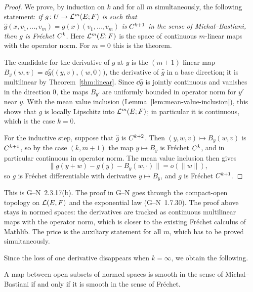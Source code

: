 \begin{proof}
  \leanok
  We prove, by induction on $k$ and for all $m$ simultaneously, the following statement:
  \emph{if $g \colon U \to \mathcal{L}^m(E; F)$ is such that
  $\hat g(x, v_1, \dots, v_m) = g(x)(v_1, \dots, v_m)$ is $C^{k+1}$ in the sense of
  Michal--Bastiani, then $g$ is Fréchet $C^{k}$}. Here $\mathcal{L}^m(E; F)$ is the space of continuous
  $m$-linear maps with the operator norm. For $m = 0$ this is the theorem.

  The candidate for the derivative of $g$ at $y$ is the $(m+1)$-linear map
  $B_y(w, v) = \dd \hat g\bigl((y, v), (w, 0)\bigr)$, the derivative of $\hat g$ in a base
  direction; it is multilinear by Theorem~\ref{thm:linear}. Since $\dd \hat g$ is jointly
  continuous and vanishes in the direction $0$, the maps $B_{y'}$ are uniformly bounded in
  operator norm for $y'$ near $y$. With the mean value inclusion
  (Lemma~\ref{lem:mean-value-inclusion}), this shows that $g$ is locally Lipschitz into
  $\mathcal{L}^m(E; F)$; in particular it is continuous, which is the case $k = 0$.

  For the inductive step, suppose that $\hat g$ is $C^{k+2}$. Then
  $(y, w, v) \mapsto B_y(w, v)$ is $C^{k+1}$, so by the case $(k, m + 1)$ the
  map $y \mapsto B_y$ is Fréchet $C^{k}$, and in particular continuous in operator norm. The mean
  value inclusion then gives
  \[
    \|g(y + w) - g(y) - B_y(w, \cdot)\| = o(\|w\|),
  \]
  so $g$ is Fréchet differentiable with derivative $y \mapsto B_y$, and $g$ is Fréchet
  $C^{k+1}$.
\end{proof}

\begin{remark}
  This is G--N~2.3.17(b). The proof in G--N goes through the compact-open topology on
  $\mathcal{L}(E, F)$ and the exponential law (G--N~1.7.30). The proof above stays in normed spaces:
  the derivatives are tracked as continuous multilinear maps with the operator norm, which is
  closer to the existing Fréchet calculus of Mathlib. The price is the auxiliary statement for
  all $m$, which has to be proved simultaneously.
\end{remark}

Since the loss of one derivative disappears when $k = \infty$, we obtain the following.

\begin{corollary}
  \label{cor:smooth-iff}
  \leanok
  A map between open subsets of normed spaces is smooth in the sense of Michal--Bastiani if and
  only if it is smooth in the sense of Fréchet.
\end{corollary}

